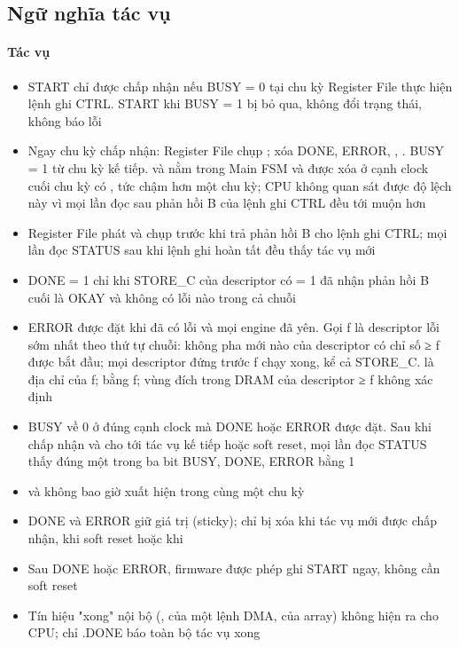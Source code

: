 \subsection{Ngữ nghĩa tác vụ}\label{sec:2.4}

\paragraph{Tác vụ}\label{par:2-4}
\begin{itemize}
\item START chỉ được chấp nhận nếu BUSY = 0 tại chu kỳ Register File thực hiện lệnh ghi CTRL. START khi BUSY = 1 bị bỏ qua, không đổi trạng thái, không báo lỗi
\item Ngay chu kỳ chấp nhận: Register File chụp ; xóa DONE, ERROR, , . BUSY = 1 từ chu kỳ kế tiếp.  và  nằm trong Main FSM và được xóa ở cạnh clock cuối chu kỳ có , tức chậm hơn một chu kỳ; CPU không quan sát được độ lệch này vì mọi lần đọc sau phản hồi B của lệnh ghi CTRL đều tới muộn hơn
\item Register File phát  và chụp  trước khi trả phản hồi B cho lệnh ghi CTRL; mọi lần đọc STATUS sau khi lệnh ghi hoàn tất đều thấy tác vụ mới
\item DONE = 1 chỉ khi STORE\_C của descriptor có  = 1 đã nhận phản hồi B cuối là OKAY và không có lỗi nào trong cả chuỗi
\item ERROR được đặt khi đã có lỗi và mọi engine đã yên. Gọi f là descriptor lỗi sớm nhất theo thứ tự chuỗi: không pha mới nào của descriptor có chỉ số ≥ f được bắt đầu; mọi descriptor đứng trước f chạy xong, kể cả STORE\_C.  là địa chỉ của f;  bằng f; vùng đích trong DRAM của descriptor ≥ f không xác định
\item BUSY về 0 ở đúng cạnh clock mà DONE hoặc ERROR được đặt. Sau khi chấp nhận và cho tới tác vụ kế tiếp hoặc soft reset, mọi lần đọc STATUS thấy đúng một trong ba bit BUSY, DONE, ERROR bằng 1
\item {} và  không bao giờ xuất hiện trong cùng một chu kỳ
\item DONE và ERROR giữ giá trị (sticky); chỉ bị xóa khi tác vụ mới được chấp nhận, khi soft reset hoặc khi 
\item Sau DONE hoặc ERROR, firmware được phép ghi START ngay, không cần soft reset
\item Tín hiệu "xong" nội bộ (,  của một lệnh DMA,  của array) không hiện ra cho CPU; chỉ .DONE báo toàn bộ tác vụ xong
\end{itemize}

